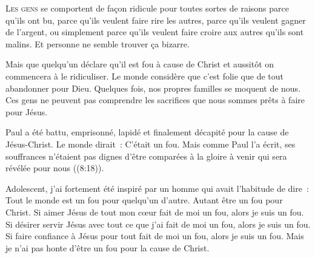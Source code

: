 

\lettrine{L}{es gens} se comportent de fa\c{c}on ridicule
 pour toutes sortes de raisons \ocadr parce qu'ils ont bu,
 parce qu'ils veulent faire rire les autres,
 parce qu'ils veulent gagner de l'argent,
 ou simplement parce qu'ils veulent faire croire aux autres qu'ils sont malins.
 Et personne ne semble trouver \c{c}a bizarre.

Mais que quelqu'un déclare qu'il est fou à cause de Christ
 et aussitôt on commencera à le ridiculiser.
 Le monde considère que c'est folie que de tout abandonner pour Dieu.
 Quelques fois, nos propres familles se moquent de nous.
 Ces gens ne peuvent pas comprendre les sacrifices
 que nous sommes prêts à faire pour Jésus.

Paul a été battu, emprisonné, lapidé et finalement décapité
 pour la cause de Jésus-Christ. Le monde dirait~: 
 \Og C'était un fou. \Fg{}
 Mais comme Paul l'a écrit, ses souffrances n'étaient pas
 \Og dignes d'être comparées à la gloire à venir
 qui sera révélée pour nous \Fg{}\linebreak ((8:18)).


Adolescent, j'ai fortement été inspiré par un homme
 qui avait l'habitude de dire~: 
 \Og Tout le monde est un fou pour quelqu'un d'autre.
 Autant être un fou pour Christ. \Fg{}
 Si aimer Jésus de tout mon c\oe{}ur fait de moi un fou,
 alors je suis un fou. Si désirer servir Jésus avec tout ce que j'ai
 fait de moi un fou, alors je suis un fou.
 Si faire confiance à Jésus pour tout fait de moi un fou,
 alors je suis un fou.
 Mais je n'ai pas honte d'être un fou pour la cause de Christ.

\dvrule






